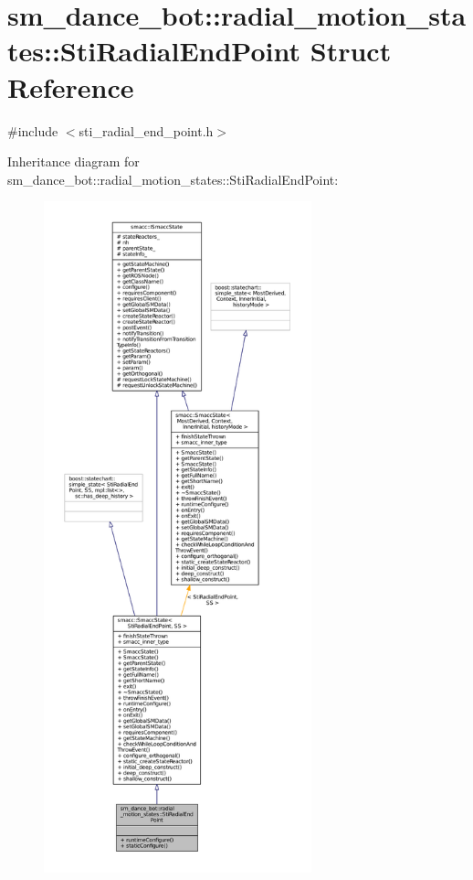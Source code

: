 \hypertarget{structsm__dance__bot_1_1radial__motion__states_1_1StiRadialEndPoint}{}\section{sm\+\_\+dance\+\_\+bot\+:\+:radial\+\_\+motion\+\_\+states\+:\+:Sti\+Radial\+End\+Point Struct Reference}
\label{structsm__dance__bot_1_1radial__motion__states_1_1StiRadialEndPoint}


{\ttfamily \#include $<$sti\+\_\+radial\+\_\+end\+\_\+point.\+h$>$}



Inheritance diagram for sm\+\_\+dance\+\_\+bot\+:\+:radial\+\_\+motion\+\_\+states\+:\+:Sti\+Radial\+End\+Point\+:
\nopagebreak
\begin{figure}[H]
\begin{center}
\leavevmode
\includegraphics[height=550pt]{structsm__dance__bot_1_1radial__motion__states_1_1StiRadialEndPoint__inherit__graph}
\end{center}
\end{figure}


